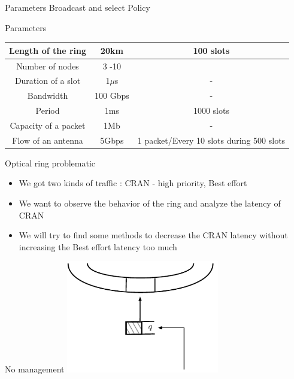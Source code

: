 \documentclass[10 pt]{beamer}
\begin{document}
\begin{frame}{Parameters}
 \centering Broadcast and select Policy 
 
 
 \begin{block}{Parameters}
\centering
  \begin{tabular}{|c|c|c|}
  \hline
  Length of the ring & 20km & 100 slots\\
   \hline
  Number of nodes & 3 -10 & \\
  \hline
  Duration of a slot & 1$\mu$s & -\\
  \hline
  Bandwidth & 100 Gbps & -\\
  \hline
    Period & 1ms & 1000 slots\\
  \hline
    Capacity of a packet & 1Mb & -\\
  \hline
      Flow of an antenna & 5Gbps & 1 packet/Every 10 slots during 500 slots\\
  \hline
  \end{tabular}

 \end{block}

\end{frame}

\begin{frame}{Optical ring problematic}
\begin{itemize}
\item We got two kinds of traffic : CRAN - high priority, Best effort
\vspace{1cm}
\item We want to observe the behavior of the ring and analyze the latency of CRAN
\vspace{1cm}
\item We will try to find some methods to decrease the CRAN latency without increasing the Best effort latency too much
\end{itemize}
\end{frame}

\begin{frame}{No management}
\centering
\includegraphics[width=0.5\textwidth]{insertion0.pdf}


\end{frame}
\end{document}
